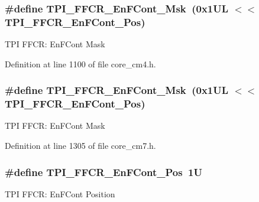\subsubsection[{\texorpdfstring{T\+P\+I\+\_\+\+F\+F\+C\+R\+\_\+\+En\+F\+Cont\+\_\+\+Msk}{TPI_FFCR_EnFCont_Msk}}]{\setlength{\rightskip}{0pt plus 5cm}\#define T\+P\+I\+\_\+\+F\+F\+C\+R\+\_\+\+En\+F\+Cont\+\_\+\+Msk~(0x1\+U\+L $<$$<$ T\+P\+I\+\_\+\+F\+F\+C\+R\+\_\+\+En\+F\+Cont\+\_\+\+Pos)}\hypertarget{group___c_m_s_i_s___t_p_i_ga27d1ecf2e0ff496df03457a2a97cb2c9}{}\label{group___c_m_s_i_s___t_p_i_ga27d1ecf2e0ff496df03457a2a97cb2c9}
T\+PI F\+F\+CR\+: En\+F\+Cont Mask 

Definition at line 1100 of file core\+\_\+cm4.\+h.

\subsubsection[{\texorpdfstring{T\+P\+I\+\_\+\+F\+F\+C\+R\+\_\+\+En\+F\+Cont\+\_\+\+Msk}{TPI_FFCR_EnFCont_Msk}}]{\setlength{\rightskip}{0pt plus 5cm}\#define T\+P\+I\+\_\+\+F\+F\+C\+R\+\_\+\+En\+F\+Cont\+\_\+\+Msk~(0x1\+U\+L $<$$<$ T\+P\+I\+\_\+\+F\+F\+C\+R\+\_\+\+En\+F\+Cont\+\_\+\+Pos)}\hypertarget{group___c_m_s_i_s___t_p_i_ga27d1ecf2e0ff496df03457a2a97cb2c9}{}\label{group___c_m_s_i_s___t_p_i_ga27d1ecf2e0ff496df03457a2a97cb2c9}
T\+PI F\+F\+CR\+: En\+F\+Cont Mask 

Definition at line 1305 of file core\+\_\+cm7.\+h.

\subsubsection[{\texorpdfstring{T\+P\+I\+\_\+\+F\+F\+C\+R\+\_\+\+En\+F\+Cont\+\_\+\+Pos}{TPI_FFCR_EnFCont_Pos}}]{\setlength{\rightskip}{0pt plus 5cm}\#define T\+P\+I\+\_\+\+F\+F\+C\+R\+\_\+\+En\+F\+Cont\+\_\+\+Pos~1U}\hypertarget{group___c_m_s_i_s___t_p_i_ga99e58a0960b275a773b245e2b69b9a64}{}\label{group___c_m_s_i_s___t_p_i_ga99e58a0960b275a773b245e2b69b9a64}
T\+PI F\+F\+CR\+: En\+F\+Cont Position 

